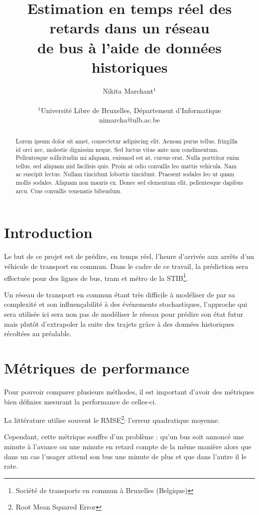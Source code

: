 \documentclass[letterpaper]{article}
\title{Estimation en temps réel des retards dans un réseau\\ de bus à l'aide de données historiques}
\author{Nikita Marchant$^{1}$\\
\mbox{}\\
$^1$Université Libre de Bruxelles, Département d'Informatique\\
nimarcha@ulb.ac.be}
\begin{document}
\maketitle

\begin{abstract}
Lorem ipsum dolor sit amet, consectetur adipiscing elit.
Aenean purus tellus, fringilla id orci nec, molestie dignissim neque.
Sed luctus vitae ante non condimentum. Pellentesque sollicitudin mi aliquam, euismod est at, cursus erat.
Nulla porttitor enim tellus, sed aliquam nisl facilisis quis.
Proin at odio convallis leo mattis vehicula. Nam ac suscipit lectus.
Nullam tincidunt lobortis tincidunt. Praesent sodales leo ut quam mollis sodales.
Aliquam non mauris ex. Donec sed elementum elit, pellentesque dapibus arcu.
Cras convallis venenatis bibendum.
\end{abstract}

\section{Introduction}

Le but de ce projet est de prédire, en temps réel, l'heure d'arrivée aux arrêts d'un véhicule de transport en commun.
Dans le cadre de ce travail, la prédiction sera effectuée pour des lignes de bus,
tram et métro de la STIB\footnote{Société de transports en commun à Bruxelles (Belgique)}.

Un réseau de transport en commun étant très difficile à modéliser de par sa complexité et son influençabilité à des événements stochastiques,
l'approche qui sera utilisée ici sera non pas de modéliser le réseau pour prédire son état futur mais plutôt d'extrapoler la suite des trajets grâce à des données historiques récoltées au préalable.

\section{Métriques de performance}

Pour pouvoir comparer plusieurs méthodes,
il est important d'avoir des métriques bien définies mesurant la performance de celles-ci.

La littérature utilise souvent le RMSE\footnote{Root Mean Squared Error}: l'erreur quadratique moyenne.

Cependant, cette métrique souffre d'un problème :
qu'un bus soit annoncé une minute à l'avance ou une minute en retard compte de la même manière alors que dans un cas l'usager attend son bus une minute de plus et que dans l'autre il le rate.
\end{document}
